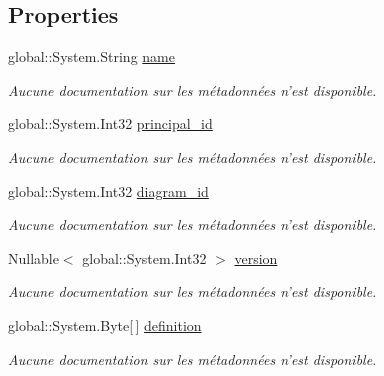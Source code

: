\subsection*{Properties}
\begin{DoxyCompactItemize}
\item 
global\-::\-System.\-String \hyperlink{class_model_1_1sysdiagrams_a7b2a5e745f15a3fde21f58e57786c2a0}{name}
\begin{DoxyCompactList}\small\item\em Aucune documentation sur les métadonnées n'est disponible. \end{DoxyCompactList}\item 
global\-::\-System.\-Int32 \hyperlink{class_model_1_1sysdiagrams_ae438ae2c8f6f3fa8f1a52aeabdba5efd}{principal\-\_\-id}
\begin{DoxyCompactList}\small\item\em Aucune documentation sur les métadonnées n'est disponible. \end{DoxyCompactList}\item 
global\-::\-System.\-Int32 \hyperlink{class_model_1_1sysdiagrams_a9ce7be08043952209a0b1fce62fe0d86}{diagram\-\_\-id}
\begin{DoxyCompactList}\small\item\em Aucune documentation sur les métadonnées n'est disponible. \end{DoxyCompactList}\item 
Nullable$<$ global\-::\-System.\-Int32 $>$ \hyperlink{class_model_1_1sysdiagrams_a173f1f695fb8a41ddbb2b1591650fd59}{version}
\begin{DoxyCompactList}\small\item\em Aucune documentation sur les métadonnées n'est disponible. \end{DoxyCompactList}\item 
global\-::\-System.\-Byte\mbox{[}$\,$\mbox{]} \hyperlink{class_model_1_1sysdiagrams_a987f2c535acceec4fa63362005fcf726}{definition}
\begin{DoxyCompactList}\small\item\em Aucune documentation sur les métadonnées n'est disponible. \end{DoxyCompactList}\end{DoxyCompactItemize}


